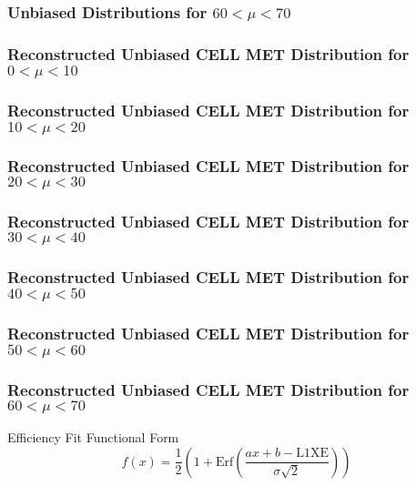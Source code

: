\documentclass[]{beamer}
\begin{document}
\begin{frame}
        \frametitle{Unbiased Distributions for $60<\mu<70$}
\end{frame}
\begin{frame}
        \frametitle{Reconstructed Unbiased CELL MET Distribution for $0<\mu<10$}
\end{frame}
\begin{frame}
        \frametitle{Reconstructed Unbiased CELL MET Distribution for $10<\mu<20$}
\end{frame}
\begin{frame}
        \frametitle{Reconstructed Unbiased CELL MET Distribution for $20<\mu<30$}
\end{frame}
\begin{frame}
        \frametitle{Reconstructed Unbiased CELL MET Distribution for $30<\mu<40$}
\end{frame}
\begin{frame}
        \frametitle{Reconstructed Unbiased CELL MET Distribution for $40<\mu<50$}
\end{frame}
\begin{frame}
        \frametitle{Reconstructed Unbiased CELL MET Distribution for $50<\mu<60$}
\end{frame}
\begin{frame}
        \frametitle{Reconstructed Unbiased CELL MET Distribution for $60<\mu<70$}
\end{frame}
\begin{frame}{Efficiency Fit Functional Form}
        $$f(x)=\frac{1}{2}\left( 1+\mathrm{Erf}\left( \frac{ax+b-\mathrm{L1XE}}{\sigma \sqrt{2}} \right) \right)$$
\end{frame}
\end{document}
